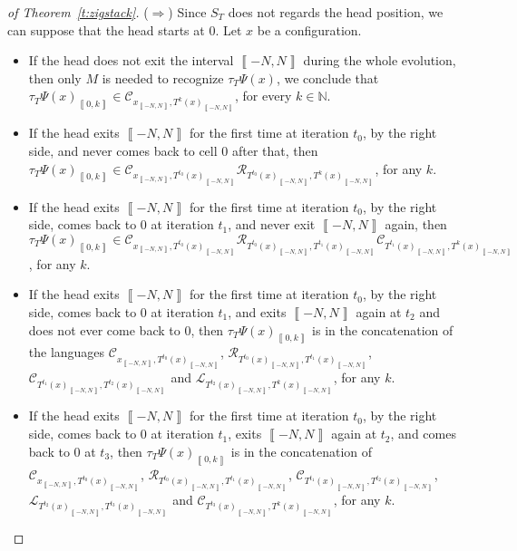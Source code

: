 \documentclass{llncs}
\newcommand{\Nset}{{\mathbb N}}
\newcommand{\co}[2]{\left\llbracket #1,#2\right\llbracket}\newcommand{\cc}[2]{\left\llbracket #1,#2\right\rrbracket}\newcommand{\oo}[2]{\left\rrbracket #1,#2\right\llbracket}\newcommand{\oc}[2]{\left\rrbracket #1,#2\right\rrbracket}\newcommand{\ci}[1]{\co{#1}\infty}\newcommand{\io}[1]{\oo{-\infty}{#1}}\newcommand{\oi}[1]{\oo{#1}\infty}\newcommand{\ic}[1]{\oc{-\infty}{#1}}
\newcommand{\scc}[2]{_{\cc{#1}{#2}}}\newcommand{\sco}[2]{_{\co{#1}{#2}}}\newcommand{\soo}[2]{_{\oo{#1}{#2}}}\newcommand{\soc}[2]{_{\oc{#1}{#2}}}\newcommand{\sci}[1]{_{\ci{#1}}}\newcommand{\sio}[1]{_{\io{#1}}}\newcommand{\soi}[1]{_{\oi{#1}}}\newcommand{\sic}[1]{_{\ic{#1}}}
\begin{document}
\begin{proof}[of Theorem~\ref{t:zigstack}]

($\Rightarrow$)
Since $S_T$ does not regards the head position, we can suppose that the head starts at 0.
Let $x$ be a configuration.
\begin{itemize}
\item If the head does not exit the interval $\cc{-N}N$ during the whole evolution, then only $M$ is needed to recognize $\tau_T\Psi(x)$, we conclude that $\tau_T\Psi(x)\scc0k\in \mathcal C_{x\scc{-N}N,T^k(x)\scc{-N}N}$, for every $k\in \Nset$.
\item If the head exits $\cc{-N}N$ for the first time at iteration $t_0$, by the right side, and never comes back to cell $0$ after that, then $\tau_T\Psi(x)\scc0k\in \mathcal C_{x\scc{-N}N,T^{t_0}(x)\scc{-N}N}\mathcal R_{T^{t_0}(x)\scc{-N}N,T^{k}(x)\scc{-N}N}$, for any $k$.
\item If the head exits $\cc{-N}N$ for the first time at iteration $t_0$, by the right side, comes back to $0$ at iteration $t_1$, and never exit $\cc{-N}N$ again, then 
$\tau_T\Psi(x)\scc0k\in \mathcal C_{x\scc{-N}N,T^{t_0}(x)\scc{-N}N}\mathcal R_{T^{t_0}(x)\scc{-N}N,T^{t_1}(x)\scc{-N}N}\mathcal C_{T^{t_1}(x)\scc{-N}N,T^{k}(x)\scc{-N}N}$, for any $k$.
\item If the head exits $\cc{-N}N$ for the first time at iteration $t_0$, by the right side, comes back to $0$ at iteration $t_1$, and exits $\cc{-N}N$ again at $t_2$ and does not ever come back to $0$, then $\tau_T\Psi(x)\scc0k$ is in the concatenation of the languages $\mathcal C_{x\scc{-N}N,T^{t_0}(x)\scc{-N}N}$, $\mathcal R_{T^{t_0}(x)\scc{-N}N,T^{t_1}(x)\scc{-N}N}$, $\mathcal C_{T^{t_1}(x)\scc{-N}N,T^{t_2}(x)\scc{-N}N}$ and $\mathcal L_{T^{t_2}(x)\scc{-N}N,T^{k}(x)\scc{-N}N}$, for any $k$.
\item If the head exits $\cc{-N}N$ for the first time at iteration $t_0$, by the right side, comes back to $0$ at iteration $t_1$, exits $\cc{-N}N$ again at $t_2$, and comes back to $0$ at $t_3$, then $\tau_T\Psi(x)\scc0k$ is in the concatenation of $\mathcal C_{x\scc{-N}N,T^{t_0}(x)\scc{-N}N}$, $\mathcal R_{T^{t_0}(x)\scc{-N}N,T^{t_1}(x)\scc{-N}N}$, $\mathcal C_{T^{t_1}(x)\scc{-N}N,T^{t_2}(x)\scc{-N}N}$, $\mathcal L_{T^{t_2}(x)\scc{-N}N,T^{t_3}(x)\scc{-N}N}$ and $\mathcal C_{T^{t_3}(x)\scc{-N}N,T^{k}(x)\scc{-N}N}$, for any $k$.
\end{itemize}


\end{proof}
\end{document}
